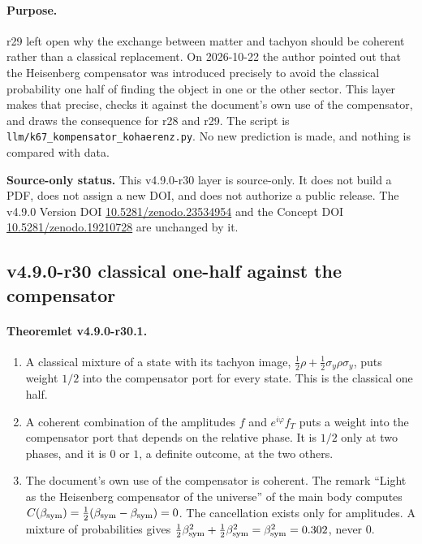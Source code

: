 \paragraph{Purpose.}
r29 left open why the exchange between matter and tachyon should be coherent rather than a classical replacement.  On 2026-10-22
the author pointed out that the Heisenberg compensator was introduced precisely to avoid the classical probability one half of
finding the object in one or the other sector.  This layer makes that precise, checks it against the document's own use of the
compensator, and draws the consequence for r28 and r29.  The script is \texttt{llm/k67\_kompensator\_kohaerenz.py}.  No new
prediction is made, and nothing is compared with data.

\noindent\textbf{Source-only status.}
This v4.9.0-r30 layer is source-only.  It does not build a PDF, does not assign a new DOI,
and does not authorize a public release.  The v4.9.0 Version DOI
\href{https://doi.org/10.5281/zenodo.23534954}{10.5281/zenodo.23534954} and the Concept DOI
\href{https://doi.org/10.5281/zenodo.19210728}{10.5281/zenodo.19210728} are unchanged by it.

\subsection*{v4.9.0-r30 classical one-half against the compensator}
\label{subsec:v490-r30-one-half}

\paragraph{Theoremlet v4.9.0-r30.1.}
\begin{enumerate}[leftmargin=2em]
\item[(a)] A classical mixture of a state with its tachyon image, \(\tfrac12\rho+\tfrac12\sigma_y\rho\sigma_y\), puts weight \(1/2\) into the
compensator port for every state.  This is the classical one half.
\item[(b)] A coherent combination of the amplitudes \(f\) and \(e^{i\varphi}f_T\) puts a weight into the compensator port that depends on the
relative phase.  It is \(1/2\) only at two phases, and it is \(0\) or \(1\), a definite outcome, at the two others.
\item[(c)] The document's own use of the compensator is coherent.  The remark ``Light as the Heisenberg compensator of the universe''
of the main body computes \(C(\beta_{\mathrm{sym}})=\tfrac12(\beta_{\mathrm{sym}}-\beta_{\mathrm{sym}})=0\).  The cancellation exists only for amplitudes.  A mixture of
probabilities gives \(\tfrac12\beta_{\mathrm{sym}}^2+\tfrac12\beta_{\mathrm{sym}}^2=\beta_{\mathrm{sym}}^2=0.302\), never \(0\).
\end{enumerate}

